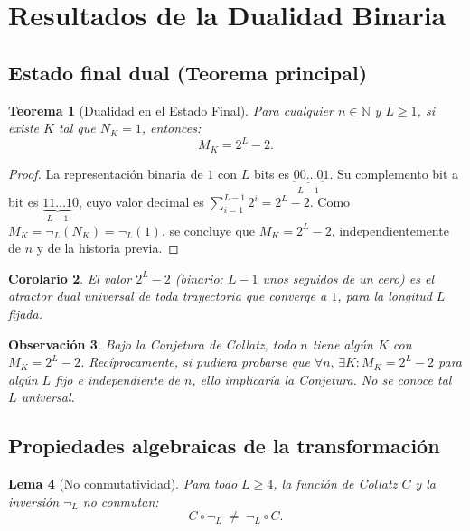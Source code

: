 \documentclass[11pt,a4paper]{article}
\newtheorem{theorem}{Teorema}[section]
\newtheorem{lemma}[theorem]{Lema}
\newtheorem{corollary}[theorem]{Corolario}
\newtheorem{remark}[theorem]{Observación}
\begin{document}
\section{Resultados de la Dualidad Binaria}
\label{sec:dualidad}

\subsection{Estado final dual (Teorema principal)}

\begin{theorem}[Dualidad en el Estado Final]
\label{thm:estado_final}
Para cualquier $n \in \mathbb{N}$ y $L \ge 1$, si existe $K$ tal que
$N_K = 1$, entonces:
\[
  M_K = 2^L - 2.
\]
\end{theorem}

\begin{proof}
La representación binaria de $1$ con $L$ bits es
$\underbrace{00\dots0}_{L-1}1$.
Su complemento bit a bit es $\underbrace{11\dots1}_{L-1}0$,
cuyo valor decimal es $\sum_{i=1}^{L-1}2^i = 2^L - 2$.
Como $M_K = \neg_L(N_K) = \neg_L(1)$, se concluye que
$M_K = 2^L - 2$, independientemente de $n$ y de la historia previa.
\end{proof}

\begin{corollary}
El valor $2^L - 2$ (binario: $L-1$ unos seguidos de un cero)
es el \emph{atractor dual universal} de toda trayectoria que converge
a $1$, para la longitud $L$ fijada.
\end{corollary}

\begin{remark}
Bajo la Conjetura de Collatz, todo $n$ tiene algún $K$ con $M_K = 2^L-2$.
Recíprocamente, si pudiera probarse que $\forall n,\,\exists K: M_K = 2^L-2$
para algún $L$ fijo e independiente de $n$, ello implicaría la Conjetura.
No se conoce tal $L$ universal.
\end{remark}

\subsection{Propiedades algebraicas de la transformación}

\begin{lemma}[No conmutatividad]
\label{lemma:no_conmuta}
Para todo $L \ge 4$, la función de Collatz $C$ y la inversión $\neg_L$
\emph{no conmutan}:
\[
  C \circ \neg_L \;\neq\; \neg_L \circ C.
\]
\end{lemma}
\end{document}

